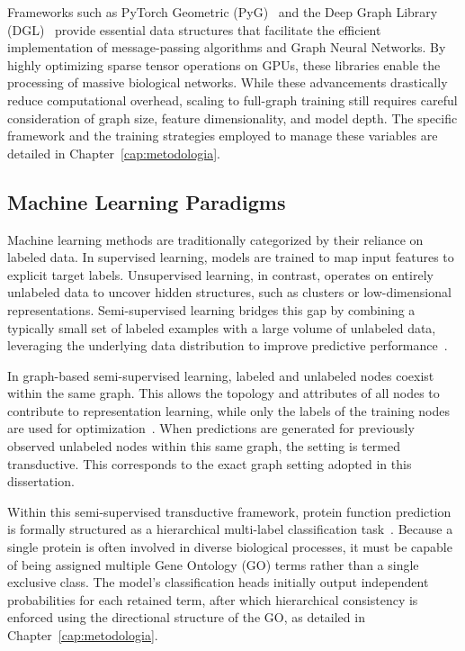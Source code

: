 \documentclass[Ingles]{ic-tese-v3}
\begin{document}
Frameworks such as PyTorch Geometric (PyG)~\cite{fey2019fast} and the Deep Graph Library (DGL)~\cite{wang2019deep} provide essential data structures that facilitate the efficient implementation of message-passing algorithms and Graph Neural Networks. By highly optimizing sparse tensor operations on GPUs, these libraries enable the processing of massive biological networks. While these advancements drastically reduce computational overhead, scaling to full-graph training still requires careful consideration of graph size, feature dimensionality, and model depth. The specific framework and the training strategies employed to manage these variables are detailed in Chapter~\ref{cap:metodologia}.

\subsection{Machine Learning Paradigms}

Machine learning methods are traditionally categorized by their reliance on labeled data. In supervised learning, models are trained to map input features to explicit target labels. Unsupervised learning, in contrast, operates on entirely unlabeled data to uncover hidden structures, such as clusters or low-dimensional representations. Semi-supervised learning bridges this gap by combining a typically small set of labeled examples with a large volume of unlabeled data, leveraging the underlying data distribution to improve predictive performance~\cite{bishop2006pattern}.

In graph-based semi-supervised learning, labeled and unlabeled nodes coexist within the same graph. This allows the topology and attributes of all nodes to contribute to representation learning, while only the labels of the training nodes are used for optimization~\cite{kipf2017semi}. When predictions are generated for previously observed unlabeled nodes within this same graph, the setting is termed transductive. This corresponds to the exact graph setting adopted in this dissertation.

Within this semi-supervised transductive framework, protein function prediction is formally structured as a hierarchical multi-label classification task~\cite{tsoumakas2007multi}. Because a single protein is often involved in diverse biological processes, it must be capable of being assigned multiple Gene Ontology (GO) terms rather than a single exclusive class. The model's classification heads initially output independent probabilities for each retained term, after which hierarchical consistency is enforced using the directional structure of the GO, as detailed in Chapter~\ref{cap:metodologia}.
\end{document}
